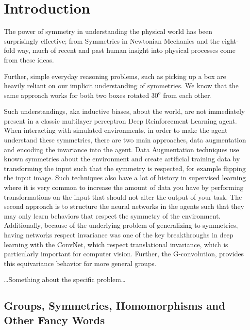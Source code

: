 \chapter{Introduction}\label{Chap1}
The power of symmetry in understanding the physical world has been surprisingly effective; from Symmetries in Newtonian Mechanics and the eight-fold way\cite{gellmann1961eight}, much of recent and past human insight into physical processes come from these ideas.

Further, simple everyday reasoning problems, such as picking up a box are heavily reliant on our implicit understanding of symmetries. We know that the same approach works for both two boxes rotated $30^o$ from each other.

Such understandings, aka inductive biases, about the world, are not immediately present in a classic multilayer perceptron Deep Reinforcement Learning agent. When interacting with simulated environments, in order to make the agent understand these symmetries, there are two main approaches, data augmentation and encoding the invariance into the agent. Data Augmentation techniques use known symmetries about the environment and create artificial training data by transforming the input such that the symmetry is respected, for example flipping the input image\cite{laskin2020reinforcement, yijion2020invariant}. Such techniques also have a lot of history in supervised learning where it is very common to increase the amount of data you have by performing transformations on the input that should not alter the output of your task.
The second approach is to structure the neural networks in the agents such that they may only learn behaviors that respect the symmetry of the environment\cite{vanderpol_2020_mdp_homomorphic, wang2022so2, mondal2020group}. Additionally, because of the underlying problem of generalizing to symmetries, having networks respect invariance was one of the key breakthroughs in deep learning with the ConvNet\cite{lecun1989backprop}, which respect translational invariance, which is particularly important for computer vision. Further, the G-convolution\cite{cohen2016group}, provides this equivariance behavior for more general groups.

\ldots Something about the specific problem\ldots


\section{Groups, Symmetries, Homomorphisms and Other Fancy Words}
